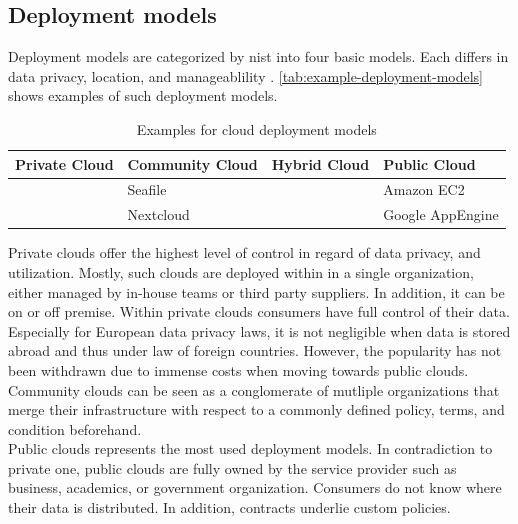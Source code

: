 \subsection{Deployment models}
\label{subsec:cloud-deployment}

Deployment models are categorized by \ac{nist} into four basic models. Each differs in data privacy, location, and manageablility \cite{Mell2011}. \autoref{tab:example-deployment-models} shows examples of such deployment models.

\begin{table}[h]
    \centering
    \caption{Examples for cloud deployment models}
    \begin{tabular}{l|l|l|l}
        Private Cloud & Community Cloud & Hybrid Cloud & Public Cloud     \\ \hline
                      & Seafile         &              & Amazon EC2       \\
                      & Nextcloud       &              & Google AppEngine \\
    \end{tabular}
    \label{tab:example-deployment-models}
\end{table}

Private clouds offer the highest level of control in regard of data privacy, and utilization. Mostly, such clouds are deployed within in a single organization, either managed by in-house teams or third party suppliers. In addition, it can be on or off premise. Within private clouds consumers have full control of their data. Especially for European data privacy laws, it is not negligible when data is stored abroad and thus under law of foreign countries. However, the popularity has not been withdrawn due to immense costs when moving towards public clouds. \cite{Dillon2010} \cite{Mell2011}\\

Community clouds can be seen as a conglomerate of mutliple organizations that merge their infrastructure with respect to a commonly defined policy, terms, and condition beforehand.\\

Public clouds represents the most used deployment models. In contradiction to private one, public clouds are fully owned by the service provider such as business, academics, or government organization. Consumers do not know where their data is distributed. In addition, contracts underlie custom policies.\\


